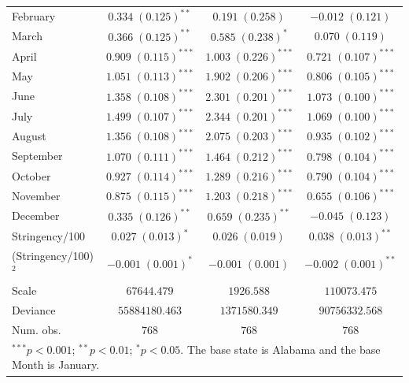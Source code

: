 \documentclass[10pt,letterpaper]{article}
\begin{document}
\begin{table}
\begin{center}
\begin{tabular}{l c c c}
February             & $0.334 \; (0.125)^{**}$   & $0.191 \; (0.258)$        & $-0.012 \; (0.121)$       \\
March                & $0.366 \; (0.125)^{**}$   & $0.585 \; (0.238)^{*}$    & $0.070 \; (0.119)$        \\
April                & $0.909 \; (0.115)^{***}$  & $1.003 \; (0.226)^{***}$  & $0.721 \; (0.107)^{***}$  \\
May                  & $1.051 \; (0.113)^{***}$  & $1.902 \; (0.206)^{***}$  & $0.806 \; (0.105)^{***}$  \\
June                 & $1.358 \; (0.108)^{***}$  & $2.301 \; (0.201)^{***}$  & $1.073 \; (0.100)^{***}$  \\
July                 & $1.499 \; (0.107)^{***}$  & $2.344 \; (0.201)^{***}$  & $1.069 \; (0.100)^{***}$  \\
August               & $1.356 \; (0.108)^{***}$  & $2.075 \; (0.203)^{***}$  & $0.935 \; (0.102)^{***}$  \\
September            & $1.070 \; (0.111)^{***}$  & $1.464 \; (0.212)^{***}$  & $0.798 \; (0.104)^{***}$  \\
October              & $0.927 \; (0.114)^{***}$  & $1.289 \; (0.216)^{***}$  & $0.790 \; (0.104)^{***}$  \\
November             & $0.875 \; (0.115)^{***}$  & $1.203 \; (0.218)^{***}$  & $0.655 \; (0.106)^{***}$  \\
December             & $0.335 \; (0.126)^{**}$   & $0.659 \; (0.235)^{**}$   & $-0.045 \; (0.123)$       \\
Stringency/100       & $0.027 \; (0.013)^{*}$    & $0.026 \; (0.019)$        & $0.038 \; (0.013)^{**}$   \\
(Stringency/100)$^2$ & $-0.001 \; (0.001)^{*}$   & $-0.001 \; (0.001)$       & $-0.002 \; (0.001)^{**}$  \\
\hline
Scale                & $67644.479$               & $1926.588$                & $110073.475$              \\
Deviance             & $55884180.463$            & $1371580.349$             & $90756332.568$            \\
Num. obs.            & $768$                     & $768$                     & $768$                     \\
\hline
\multicolumn{4}{l}{\scriptsize{$^{***}p<0.001$; $^{**}p<0.01$; $^{*}p<0.05$. The base state is Alabama and the base Month is January.}}
\end{tabular}
\label{regResults}
\end{center}
\end{table}
\end{document}
